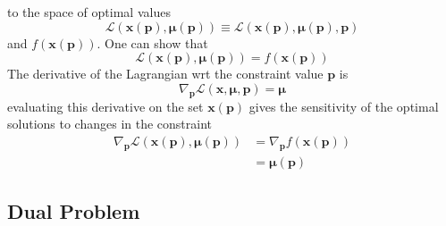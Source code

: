 \documentclass[aps,preprint]{revtex4}%
\begin{document}
to the space of optimal values
\[
\mathcal{L}\left(  \mathbf{x\left(  \mathbf{p}\right)  ,\mu\left(
\mathbf{p}\right)  }\right)  \equiv\mathcal{L}\left(  \mathbf{x}\left(
\mathbf{p}\right)  \mathbf{,\mu\left(  \mathbf{p}\right)  ,p}\right)
\]
and $f\left(  \mathbf{x}\left(  \mathbf{p}\right)  \right)  $. One can show
that
\[
\mathcal{L}\left(  \mathbf{x\left(  \mathbf{p}\right)  ,\mu\left(
\mathbf{p}\right)  }\right)  =f\left(  \mathbf{x}\left(  \mathbf{p}\right)
\right)
\]
The derivative of the Lagrangian wrt the constraint value $\mathbf{p}$ is
\[
\nabla_{\mathbf{p}}\mathcal{L}\left(  \mathbf{x,\mu,p}\right)  =\mathbf{\mu}%
\]
evaluating this derivative on the set $\mathbf{x}\left(  \mathbf{p}\right)  $
gives the sensitivity of the optimal solutions to changes in the constraint
\begin{align*}
\nabla_{\mathbf{p}}\mathcal{L}\left(  \mathbf{x\left(  \mathbf{p}\right)
,\mu\left(  \mathbf{p}\right)  }\right)   &  =\nabla_{\mathbf{p}}f\left(
\mathbf{x}\left(  \mathbf{p}\right)  \right)  \\
&  =\mathbf{\mu\left(  \mathbf{p}\right)  }%
\end{align*}


\subsection{Dual Problem}
\end{document}
